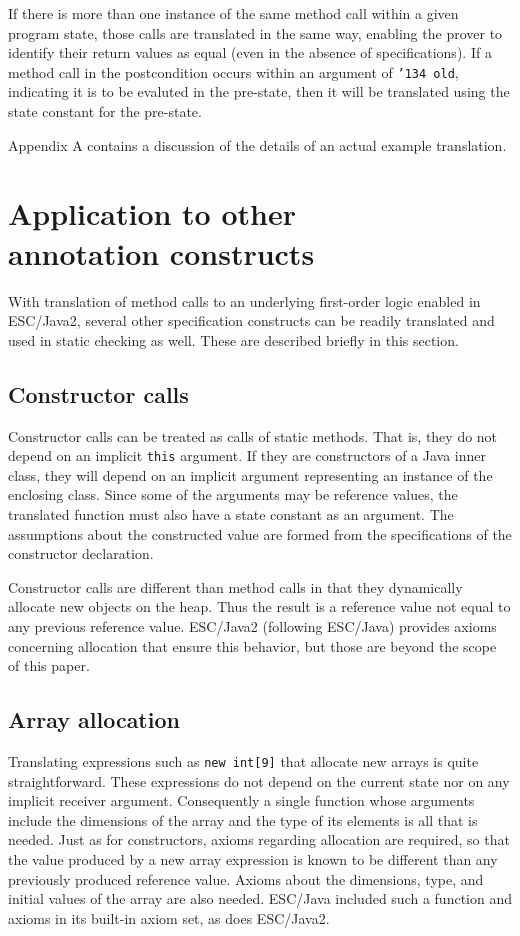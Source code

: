 \documentclass{sig-alternate2}
\begin{document}
If there is
more than one instance of the same method call within a given program state, those calls are
translated in the same way, enabling the prover to identify their return values as equal (even
in the absence of specifications).  If
a method call in the postcondition occurs within 
an argument of \texttt{\char'134 old}, indicating it is to
be evaluted in the pre-state, then it will be translated using the state constant for the pre-state.

Appendix A contains a discussion of the details of an actual example translation.


\section{Application to other \\ annotation constructs}

With translation of method calls to an underlying first-order logic enabled in ESC/Java2, 
several other specification constructs can be readily translated and used in static checking as 
well.  These are described briefly in this section.
 
\subsection{Constructor calls}

Constructor calls can be treated as calls of static methods.  That is, they do not depend on an
implicit \texttt{this} argument.  If they are constructors of a Java inner class, they will depend 
on an implicit argument representing an instance of the enclosing class.  Since some of the 
arguments may be reference values, the translated function must also have a state constant
as an argument.  The assumptions about the constructed value are formed from the specifications
of the constructor declaration.

Constructor calls are different than method calls 
in that they dynamically allocate new objects on the 
heap.  Thus the result is a reference value not equal to any previous reference value.  ESC/Java2
(following ESC/Java) provides axioms concerning allocation that ensure this behavior, but 
those are beyond the scope of this paper.

\subsection{Array allocation}

Translating expressions such as \texttt{new int[9]} that allocate new arrays is quite straightforward.
These expressions do not depend on the current state nor on any implicit receiver argument.
Consequently a single function whose arguments include the dimensions of the array and
the type of its
elements is all that is needed.
Just as for constructors, axioms regarding allocation are required, 
so that the value produced by a new array
expression is known to be different than any previously produced reference value.  Axioms about
the dimensions, type, and initial values of the array are also needed.
ESC/Java included such a function and axioms in its built-in axiom set, as does ESC/Java2.
\end{document}
